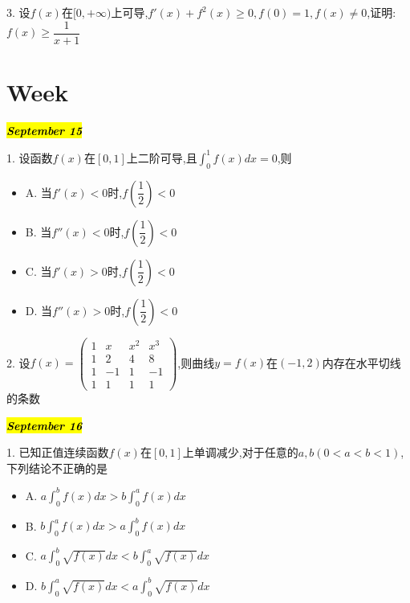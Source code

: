 3. 设$f(x)$在$[0,+\infty)$上可导,$f'(x)+f^2(x)\geq 0,f(0)=1,f(x)\neq 0$,证明:  $f(x)\geq \dfrac{1}{x+1}$
\begin{solution}
	
\end{solution}

\section{Week }
\hl{\textbf{\textit{September 15}}}

1. 设函数$f(x)$在$[0,1]$上二阶可导,且$\int_{0}^{1}f(x)dx=0$,则
\begin{itemize}
	\item A. 当$f'(x)<0$时,$f(\dfrac{1}{2})<0$
	\item B. 当$f''(x)<0$时,$f(\dfrac{1}{2})<0$
	\item C. 当$f'(x)>0$时,$f(\dfrac{1}{2})<0$
	\item D. 当$f''(x)>0$时,$f(\dfrac{1}{2})<0$
\end{itemize}
\begin{solution}
	
\end{solution}

2. 设$f(x)=\begin{pmatrix}
	1&x&x^2&x^3\\
	1&2&4&8\\
	1&-1&1&-1\\
	1&1&1&1
\end{pmatrix}$,则曲线$y=f(x)$在$(-1,2)$内存在水平切线的条数
\begin{solution}
	
\end{solution}

\hl{\textbf{\textit{September 16}}}

1. 已知正值连续函数$f(x)$在$[0,1]$上单调减少,对于任意的$a,b(0<a<b<1)$,下列结论不正确的是
\begin{itemize}
	\item A. $a\int_{0}^{b}f(x)dx>b\int_{0}^{a}f(x)dx$
	\item B. $b\int_{0}^{a}f(x)dx>a\int_{0}^{b}f(x)dx$
	\item C. $a\int_{0}^{b}\sqrt{f(x)}dx<b\int_{0}^{a}\sqrt{f(x)}dx$
	\item D. $b\int_{0}^{a}\sqrt{f(x)}dx<a\int_{0}^{b}\sqrt{f(x)}dx$
\end{itemize}
\begin{solution}
	
\end{solution}

